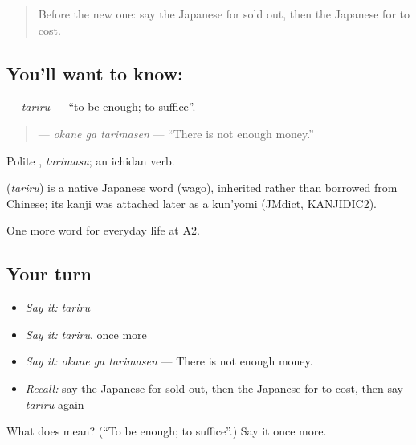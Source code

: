 \label{lesson:JA-C185-tariru}



\begin{quote}
Before the new one: say the Japanese for sold out, then the Japanese for to cost.
\end{quote}

\subsection*{You'll want to know: }
\textbf{} — \emph{tariru} — \textquotedblleft{}to be enough; to suffice\textquotedblright{}.

\begin{quote}
\textbf{ } — \emph{okane ga tarimasen} — \textquotedblleft{}There is not enough money.\textquotedblright{}
\end{quote}

Polite \textbf{}, \emph{tarimasu}; an ichidan verb.

\begin{cousinweb}
\textbf{} (\emph{tariru}) is a native Japanese word (wago), inherited rather than borrowed from Chinese; its kanji was attached later as a kun'yomi (JMdict, KANJIDIC2).
\end{cousinweb}

\begin{grammarlens}[title={What you've built}]
One more word for everyday life at A2.
\end{grammarlens}

\subsection*{Your turn}
\begin{itemize}
\raggedright
  \item \emph{Say it:} \emph{tariru}
  \item \emph{Say it:} \emph{tariru}, once more
  \item \emph{Say it:} \emph{okane ga tarimasen} — There is not enough money.
  \item \emph{Recall:} say the Japanese for sold out, then the Japanese for to cost, then say \emph{tariru} again
\end{itemize}

\begin{tcolorbox}[breakable,colback=teal!4,colframe=teal!35!black,title={Before you move on}]
What does  mean? (\textquotedblleft{}To be enough; to suffice\textquotedblright{}.) Say it once more.
\end{tcolorbox}
